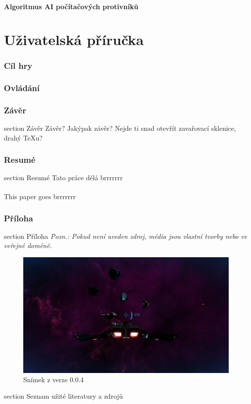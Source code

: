 \documentclass[12pt,a4paper,hidelinks]{article}
\begin{document}
\subsection{Algoritmus AI počítačových protivníků}
\clearpage

\part{Uživatelská příručka}

\section{Cíl hry}

\section{Ovládání}

\clearpage
\section*{Závěr}
 {section} {Závěr}
Závěr? Jakýpak závěr? Nejde ti snad otevřít zavařovací sklenice, drahý TeXu?

\clearpage

\section*{Resumé}
 {section} {Resumé}
Tato práce dělá brrrrrrr\\
\\
This paper goes brrrrrrr\\


\clearpage

\section*{Příloha}
 {section} {Příloha}
\textit{Pozn.: Pokud není uveden zdroj, média jsou vlastní tvorby nebo ve veřejné doméně.}

\begin{figure}[h!]
	\centering
	\includegraphics[width=1.0\textwidth]{images/astra004_gameplay.png}
	\caption{Snímek z verze 0.0.4}
\end{figure}
\clearpage


\printbibliography[title={Seznam literatury a zdrojů}]
 {section} {Seznam užité literatury a zdrojů}
\end{document}
